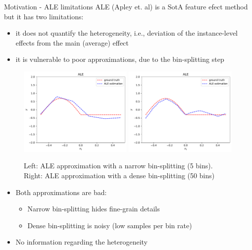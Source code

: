 \documentclass[final]{beamer}
\newlength{\colwidth}
\begin{document}
\begin{frame}[t]
\begin{columns}[t]
\begin{column}{\colwidth}
			\begin{block}{Motivation - ALE limitations}{}
        ALE (Apley et. al) is a SotA feature efect method but it has two limitations:
        \begin{itemize}
        \item it does not quantify the heterogeneity, i.e., deviation of the instance-level effects from the main (average) effect
          \item it is vulnerable to poor approximations, due to the bin-splitting step
        \end{itemize}
        \begin{figure}
          \centering
          \includegraphics[width=0.49\textwidth]{./../code/concept_figure/exp_1_ale_5_bins_0.pdf}
          \includegraphics[width=0.49\textwidth]{./../code/concept_figure/exp_1_ale_50_bins_0.pdf}
          \caption{Left: ALE approximation with a narrow bin-splitting (5 bins). Right: ALE approximation with a dense bin-splitting (50 bins)}
          \label{fig:acc-1}
        \end{figure}
        \begin{itemize}
        \item Both approximations are bad:
          \begin{itemize}
          \item Narrow bin-splitting hides fine-grain details
            \item Dense bin-splitting is noisy (low samples per bin rate)
          \end{itemize}
          \item No information regarding the heterogeneity
        \end{itemize}
			\end{block}



\end{column}
\end{columns}
\end{frame}
\end{document}
